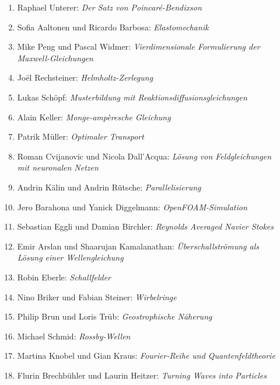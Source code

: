 \documentclass[handout]{beamer}
\begin{document}
\begin{frame}
\begin{columns}[t,onlytextwidth]
\begin{column}{0.60\textwidth}
\begin{description}
\begin{enumerate}
\item Raphael Unterer: {\em Der Satz von Poincaré-Bendixson}
\item Sofia Aaltonen und Ricardo Barbosa: {\em Elastomechanik}
\item Mike Peng und Pascal Widmer: {\em Vierdimensionale Formulierung der Maxwell-Gleichungen}
\setcounter{enumi}{19}
\item Joël Rechsteiner: {\em Helmholtz-Zerlegung}
\item Lukas Schöpf: {\em Musterbildung mit Reaktionsdiffusionsgleichungen}
\item Alain Keller: {\em Monge-ampèresche Gleichung}
\item Patrik Müller: {\em Optimaler Transport}
\item Roman Cvijanovic und Nicola Dall'Acqua:
{\em Lösung von Feldgleichungen mit neuronalen Netzen}
\item Andrin Kälin und Andrin Rütsche: {\em Parallelisierung}
\item Jero Barahona und Yanick Diggelmann: {\em OpenFOAM-Simulation}
\item Sebastian Eggli und Damian Birchler: {\em Reynolds Averaged Navier Stokes}
\item Emir Arslan und Shaarujan Kamalanathan:
{\em Überschallströmung als Lösung einer Wellengleichung}
\item Robin Eberle: {\em Schallfelder}
\item Nino Briker und Fabian Steiner: {\em Wirbelringe}
\item Philip Brun und Loris Trüb: {\em Geostrophische Näherung}
\item Michael Schmid: {\em Rossby-Wellen}
\item Martina Knobel und Gian Kraus: {\em Fourier-Reihe und Quantenfeldtheorie}
\item Flurin Brechbühler und Laurin Heitzer: {\em Turning Waves into Particles}
\end{enumerate}
\end{description}
\end{column}
\begin{column}{0.01\textwidth}
\end{column}
\end{columns}
\end{frame}
\end{document}

